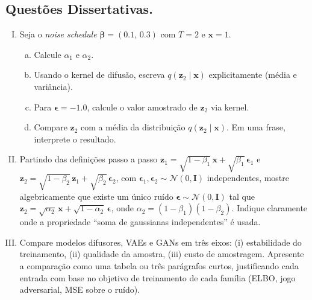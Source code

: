 \documentclass{dlproblemset}
\begin{document}
\begin{enumerate}[I)]
\end{enumerate}
\color{black}

\newpage

\subsection*{Questões Dissertativas.}

\begin{enumerate}[I)]

\item Seja o \textit{noise schedule} $\boldsymbol{\beta} = (0.1,\, 0.3)$ com $T = 2$ e $\mathbf{x} = 1$.
\begin{enumerate}[(a)]
    \item Calcule $\alpha_1$ e $\alpha_2$.
    \item Usando o kernel de difusão, escreva $q(\mathbf{z}_2 \mid \mathbf{x})$ explicitamente (média e variância).
    \item Para $\boldsymbol{\epsilon} = -1.0$, calcule o valor amostrado de $\mathbf{z}_2$ via kernel.
    \item Compare $\mathbf{z}_2$ com a média da distribuição $q(\mathbf{z}_2 \mid \mathbf{x})$. Em uma frase, interprete o resultado.
\end{enumerate}

\item {} Partindo das definições passo a passo $\mathbf{z}_1 = \sqrt{1 - \beta_1}\,\mathbf{x} + \sqrt{\beta_1}\,\boldsymbol{\epsilon}_1$ e $\mathbf{z}_2 = \sqrt{1 - \beta_2}\,\mathbf{z}_1 + \sqrt{\beta_2}\,\boldsymbol{\epsilon}_2$, com $\boldsymbol{\epsilon}_1, \boldsymbol{\epsilon}_2 \sim \mathcal{N}(0,\mathbf{I})$ independentes, mostre algebricamente que existe um único ruído $\boldsymbol{\epsilon} \sim \mathcal{N}(0,\mathbf{I})$ tal que $\mathbf{z}_2 = \sqrt{\alpha_2}\,\mathbf{x} + \sqrt{1 - \alpha_2}\,\boldsymbol{\epsilon}$, onde $\alpha_2 = (1 - \beta_1)(1 - \beta_2)$. Indique claramente onde a propriedade ``soma de gaussianas independentes'' é usada.

\item Compare modelos difusores, VAEs e GANs em três eixos: (i) estabilidade do treinamento, (ii) qualidade da amostra, (iii) custo de amostragem. Apresente a comparação como uma tabela ou três parágrafos curtos, justificando cada entrada com base no objetivo de treinamento de cada família (ELBO, jogo adversarial, MSE sobre o ruído).


\end{enumerate}
\end{document}
